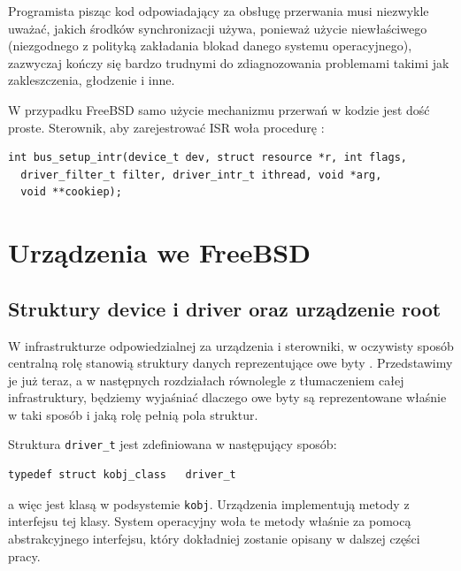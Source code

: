 \documentclass[shortabstract,inz]{iithesis}
\begin{document}
Programista pisząc kod odpowiadający za obsługę przerwania musi niezwykle uważać,
jakich środków synchronizacji używa, ponieważ użycie niewłaściwego (niezgodnego z
polityką zakładania blokad danego systemu operacyjnego), zazwyczaj kończy się
bardzo trudnymi do zdiagnozowania problemami takimi jak zakleszczenia, głodzenie
i inne.

W przypadku FreeBSD samo użycie mechanizmu przerwań w kodzie jest dość proste.
Sterownik, aby zarejestrować ISR woła procedurę \cite{man:bus_setup_intr_9}:

\begin{lstlisting}
int bus_setup_intr(device_t dev, struct resource *r, int flags,
  driver_filter_t filter, driver_intr_t ithread, void *arg,
  void **cookiep);
\end{lstlisting}







\chapter{Urządzenia we FreeBSD}

\section{Struktury device i driver oraz urządzenie root} %

W infrastrukturze odpowiedzialnej za urządzenia i sterowniki, w oczywisty sposób 
centralną rolę stanowią struktury danych reprezentujące owe byty \cite{man:driver_9}\cite{man:device_9}. 
Przedstawimy je już teraz,
a w następnych rozdziałach równolegle z tłumaczeniem całej infrastruktury,
będziemy wyjaśniać dlaczego owe byty są reprezentowane właśnie w taki sposób i
jaką rolę pełnią pola struktur.

Struktura \texttt{driver\_t} jest zdefiniowana w następujący sposób:

\begin{lstlisting}
typedef struct kobj_class   driver_t
\end{lstlisting}

a więc jest klasą w podsystemie \texttt{kobj}. 
Urządzenia implementują metody z interfejsu tej klasy. System
operacyjny woła te metody właśnie za pomocą abstrakcyjnego interfejsu,
który dokładniej zostanie opisany w dalszej części pracy.
\end{document}
